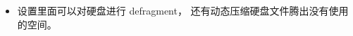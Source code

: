 

\begin{issues}
\issueDraft
\end{issues}

\begin{itemize}
\item 设置里面可以对硬盘进行 defragment， 还有动态压缩硬盘文件腾出没有使用的空间。
\end{itemize}
